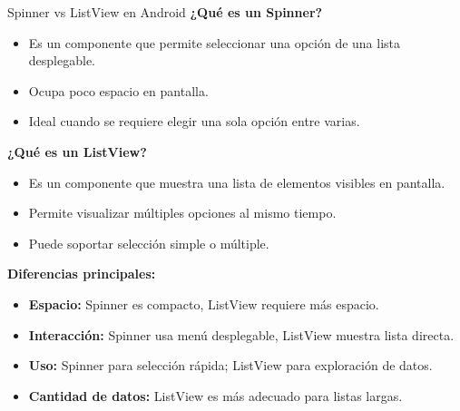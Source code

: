\begin{frame}{Spinner vs ListView en Android}
\textbf{¿Qué es un Spinner?}

\begin{itemize}
    \item Es un componente que permite seleccionar una opción de una lista desplegable.
    \item Ocupa poco espacio en pantalla.
    \item Ideal cuando se requiere elegir una sola opción entre varias.
\end{itemize}

\vspace{0.4cm}

\textbf{¿Qué es un ListView?}

\begin{itemize}
    \item Es un componente que muestra una lista de elementos visibles en pantalla.
    \item Permite visualizar múltiples opciones al mismo tiempo.
    \item Puede soportar selección simple o múltiple.
\end{itemize}

\vspace{0.4cm}

\textbf{Diferencias principales:}

\begin{itemize}
    \item \textbf{Espacio:} Spinner es compacto, ListView requiere más espacio.
    \item \textbf{Interacción:} Spinner usa menú desplegable, ListView muestra lista directa.
    \item \textbf{Uso:} Spinner para selección rápida; ListView para exploración de datos.
    \item \textbf{Cantidad de datos:} ListView es más adecuado para listas largas.
\end{itemize}

\end{frame}



